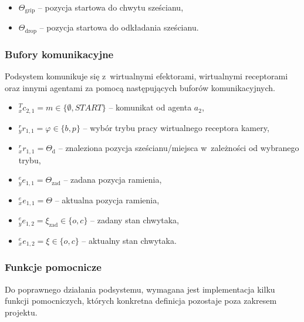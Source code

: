 \begin{itemize}
    \item $\Theta_{\mathrm{grip}}$ -- pozycja startowa do chwytu sześcianu, 
    \item $\Theta_{\mathrm{drop}}$ -- pozycja startowa do odkładania sześcianu.
\end{itemize}
    
\subsubsection{Bufory komunikacyjne}
Podsystem komunikuje się z~wirtualnymi efektorami, wirtualnymi receptorami oraz innymi agentami za pomocą następujących buforów komunikacyjnych.
\begin{itemize}
    \item ${}^{T}_{x}c_{2,1} = m \in \{ \emptyset, START \}$ -- komunikat od agenta $a_{2}$,
    
    \item ${}^{r}_{y}r_{1,1} = \varphi \in \{b, p\}$ -- wybór trybu pracy wirtualnego receptora kamery,
    \item ${}^{r}_{x}r_{1,1} = \Theta_{\mathrm{d}}$ -- znaleziona pozycja sześcianu/miejsca w~zależności od wybranego trybu,

    \item ${}^{e}_{y}e_{1,1} = \Theta_{\mathrm{zad}}$ -- zadana pozycja ramienia,
    \item ${}^{e}_{x}e_{1,1} = \Theta$ -- aktualna pozycja ramienia,

    \item ${}^{e}_{y}e_{1,2} = \xi_{\mathrm{zad}} \in \{o, c\}$ -- zadany stan chwytaka,
    \item ${}^{e}_{x}e_{1,2} = \xi \in \{o, c\}$ -- aktualny stan chwytaka.
\end{itemize}

\subsubsection{Funkcje pomocnicze}
Do poprawnego działania podsystemu, wymagana jest implementacja kilku funkcji pomocniczych, których konkretna definicja pozostaje poza zakresem projektu.

